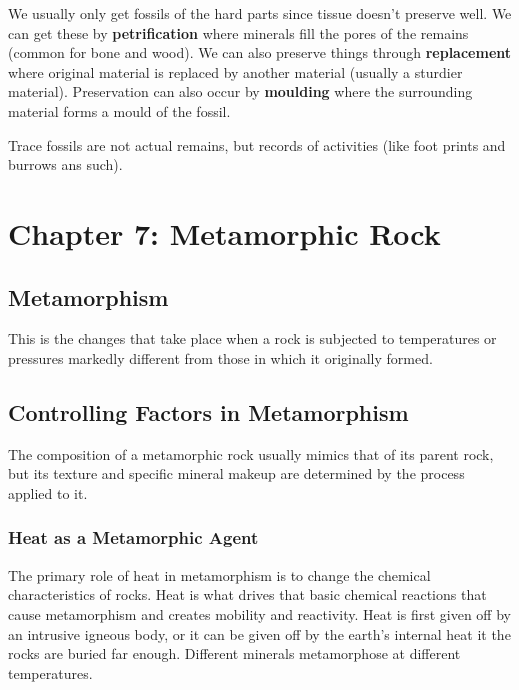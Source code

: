 \documentclass{article}
\begin{document}
We usually only get fossils of the hard parts since tissue doesn't preserve well. We can get these by \textbf{petrification} where minerals fill the pores of the remains (common for bone and wood). We can also preserve things through \textbf{replacement} where original material is replaced by another material (usually a sturdier material). Preservation can also occur by \textbf{moulding} where the surrounding material forms a mould of the fossil.

Trace fossils are not actual remains, but records of activities (like foot prints and burrows ans such).

\section{Chapter 7: Metamorphic Rock} %
\label{sec:chapter_7_metamorphic_rock}
\subsection{Metamorphism} %
\label{sub:metamorphism}
This is the changes that take place when a rock is subjected to temperatures or pressures markedly different from those in which it originally formed.

\subsection{Controlling Factors in Metamorphism} %
\label{sub:controlling_factors_in_metamorphism}
The composition of a metamorphic rock usually mimics that of its parent rock, but its texture and specific mineral makeup are determined by the process applied to it.

\subsubsection{Heat as a Metamorphic Agent} %
\label{sub:heat_as_a_metamorphic_agent}
The primary role of heat in metamorphism is to change the chemical characteristics of rocks. Heat is what drives that basic chemical reactions that cause metamorphism and creates mobility  and reactivity. Heat is first given off by an intrusive igneous body, or it can be given off by the earth's internal heat it the rocks are buried far enough. Different minerals metamorphose at different temperatures.
\end{document}
